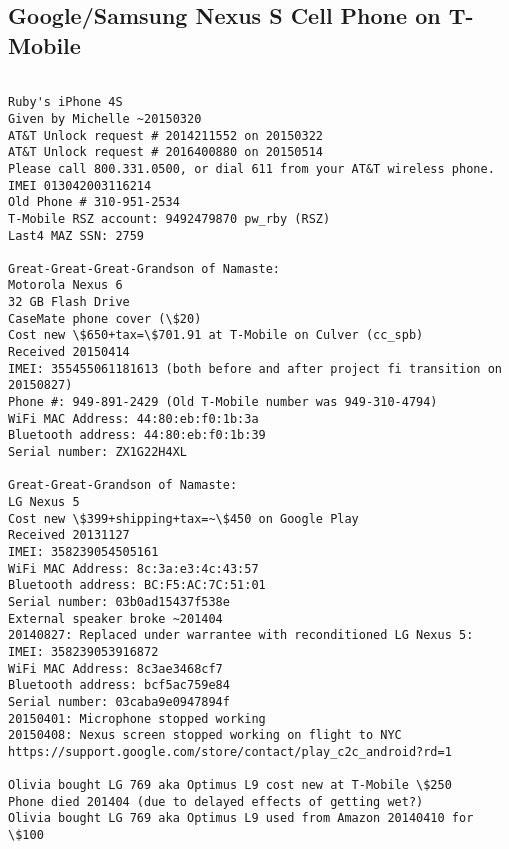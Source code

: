 \documentclass[12pt,twoside]{article}
\begin{document}
\subsection{Google/Samsung Nexus S Cell Phone on T-Mobile}\label{sxn:namaste}
\begin{verbatim}

Ruby's iPhone 4S
Given by Michelle ~20150320
AT&T Unlock request # 2014211552 on 20150322
AT&T Unlock request # 2016400880 on 20150514
Please call 800.331.0500, or dial 611 from your AT&T wireless phone. 
IMEI 013042003116214
Old Phone # 310-951-2534
T-Mobile RSZ account: 9492479870 pw_rby (RSZ)
Last4 MAZ SSN: 2759

Great-Great-Great-Grandson of Namaste:
Motorola Nexus 6
32 GB Flash Drive
CaseMate phone cover (\$20)
Cost new \$650+tax=\$701.91 at T-Mobile on Culver (cc_spb)
Received 20150414
IMEI: 355455061181613 (both before and after project fi transition on 20150827)
Phone #: 949-891-2429 (Old T-Mobile number was 949-310-4794)
WiFi MAC Address: 44:80:eb:f0:1b:3a
Bluetooth address: 44:80:eb:f0:1b:39
Serial number: ZX1G22H4XL

Great-Great-Grandson of Namaste:
LG Nexus 5
Cost new \$399+shipping+tax=~\$450 on Google Play
Received 20131127
IMEI: 358239054505161
WiFi MAC Address: 8c:3a:e3:4c:43:57
Bluetooth address: BC:F5:AC:7C:51:01
Serial number: 03b0ad15437f538e
External speaker broke ~201404
20140827: Replaced under warrantee with reconditioned LG Nexus 5:
IMEI: 358239053916872
WiFi MAC Address: 8c3ae3468cf7
Bluetooth address: bcf5ac759e84
Serial number: 03caba9e0947894f
20150401: Microphone stopped working
20150408: Nexus screen stopped working on flight to NYC
https://support.google.com/store/contact/play_c2c_android?rd=1

Olivia bought LG 769 aka Optimus L9 cost new at T-Mobile \$250
Phone died 201404 (due to delayed effects of getting wet?)
Olivia bought LG 769 aka Optimus L9 used from Amazon 20140410 for \$100


\end{verbatim}
\end{document}
